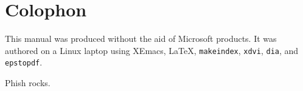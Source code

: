 \chapter{Colophon}

This manual was produced without the aid of Microsoft products.
It was authored on a Linux laptop using XEmacs, \LaTeX{},
\texttt{makeindex}, \texttt{xdvi}, \texttt{dia}, and \texttt{epstopdf}.

\rule{0pt}{17em}

\begin{flushright}
Phish rocks.
\end{flushright}
